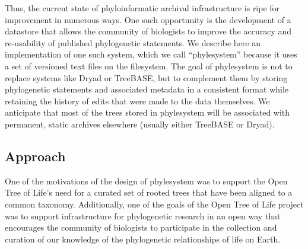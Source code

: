 \documentclass{bioinfo}
\newcommand{\ps}{phylesystem\xspace}
\newcommand{\otol}{Open Tree of Life\xspace}
\begin{document}
Thus, the current state of phyloinformatic archival infrastructure is ripe for improvement in numerous ways.
One such opportunity is the development of a datastore that allows the community of biologists to improve the
    accuracy and re-usability of published phylogenetic statements.
We describe here an implementation of one such system, which we call ``phylesystem'' because it uses a set of
    versioned text files on the filesystem. %
The goal of \ps is not to replace systems like Dryad or TreeBASE, but to complement them by 
    storing phylogenetic statements and associated metadata in a consistent format while retaining the history of
    edits that were made to the data themselves.
We anticipate that most of the trees stored in \ps will be associated with permanent, static archives
    elsewhere (usually either TreeBASE or Dryad).


\subsection{Approach}
One of the motivations of the design of \ps was to support the \otol's need for a curated set
    of rooted trees that have been aligned to a common taxonomy.
Additionally, one of the goals of the \otol project was to support infrastructure for phylogenetic
    research in an open way that encourages the community of biologists to participate in the 
    collection and curation of our knowledge of the phylogenetic relationships of life on Earth.
\end{document}
